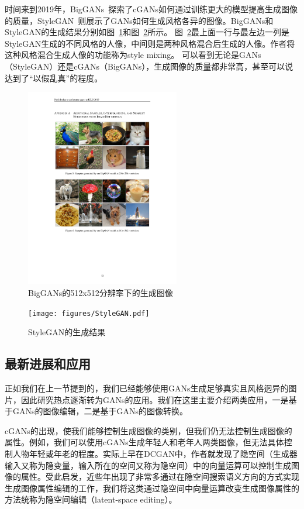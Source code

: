 时间来到2019年，BigGANs~\cite{BigGANs}探索了cGANs如何通过训练更大的模型提高生成图像的质量，StyleGAN~\cite{stylegan}则展示了GANs如何生成风格各异的图像。BigGANs和StyleGAN的生成结果分别如图~\ref{fig:BigGAN}和图~\ref{fig:StyleGAN}所示。
图~\ref{fig:StyleGAN}最上面一行与最左边一列是StyleGAN生成的不同风格的人像，中间则是两种风格混合后生成的人像。作者将这种风格混合生成人像的功能称为style mixing。
可以看到无论是GANs（StyleGAN）还是cGANs（BigGANs），生成图像的质量都非常高，甚至可以说达到了“以假乱真”的程度。

\begin{figure}
    \centering
    \includegraphics[width=0.6\textwidth]{figures/BigGAN.pdf}
    \caption{BigGANs的512x512分辨率下的生成图像}
    \label{fig:BigGAN}
\end{figure}

\begin{figure}
    \centering
    \texttt{[image: figures/StyleGAN.pdf]}
    \caption{StyleGAN的生成结果}
    \label{fig:StyleGAN}
\end{figure}


\subsection{最新进展和应用}

正如我们在上一节提到的，我们已经能够使用GANs生成足够真实且风格迥异的图片，因此研究热点逐渐转为GANs的应用。我们在这里主要介绍两类应用，一是基于GANs的图像编辑，二是基于GANs的图像转换。

cGANs的出现，使我们能够控制生成图像的类别，但我们仍无法控制生成图像的属性。例如，我们可以使用cGANs生成年轻人和老年人两类图像，但无法具体控制人物年轻或年老的程度。实际上早在DCGAN中，作者就发现了隐空间（生成器输入又称为隐变量，输入所在的空间又称为隐空间）中的向量运算可以控制生成图像的属性。受此启发，近些年出现了非常多通过在隐空间搜索语义方向的方式实现生成图像属性编辑的工作\cite{icml2020, harkonen2020ganspace, iclr2021, interfacegan, steer,variation}，我们将这类通过隐空间中向量运算改变生成图像属性的方法统称为隐空间编辑（latent-space editing）。

